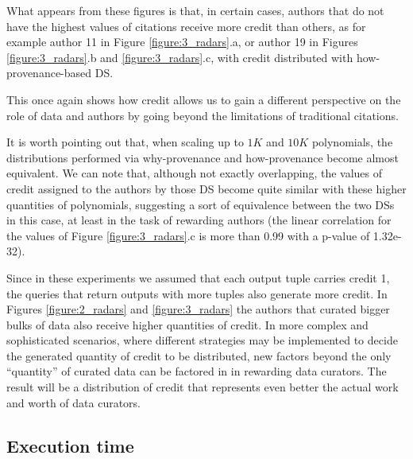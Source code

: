 What appears from these figures is that, in certain cases, authors that do not have the highest values of citations receive more credit than others, as for example author 11 in Figure \ref{figure:3_radars}.a, or author 19 in Figures \ref{figure:3_radars}.b and \ref{figure:3_radars}.c, with credit distributed with how-provenance-based DS.

This once again shows how credit allows us to gain a different perspective on the role of data and authors by going beyond the limitations of traditional citations.  

It is worth pointing out that, when scaling up to $1K$ and $10K$ polynomials, the distributions performed via why-provenance and how-provenance become almost equivalent. We can note that, although not exactly overlapping, the values of credit assigned to the authors by those DS become quite similar with these higher quantities of polynomials, suggesting a sort of equivalence between the two DSs in this case, at least in the task of rewarding authors (the linear correlation for the values of Figure \ref{figure:3_radars}.c is more than 0.99 with a p-value of 1.32e-32). 

Since in these experiments we assumed that each output tuple carries credit 1, the queries that return outputs with more tuples also generate more credit.
In Figures \ref{figure:2_radars} and \ref{figure:3_radars} the authors that curated bigger bulks of data also receive higher quantities of credit.
In more complex and sophisticated scenarios, where different strategies may be implemented to decide the generated quantity of credit to be distributed, new factors beyond the only ``quantity'' of curated data can be factored in in rewarding data curators.
The result will be a distribution of credit that represents even better the actual work and worth of data curators.


\subsection{Execution time}

